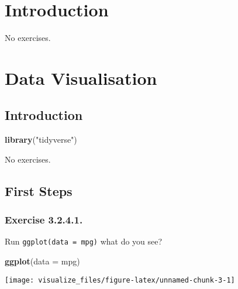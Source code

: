 \documentclass[]{book}
\newenvironment{Shaded}{\begin{snugshade}}{\end{snugshade}}
\newcommand{\DataTypeTok}[1]{\textcolor[rgb]{0.13,0.29,0.53}{#1}}
\newcommand{\KeywordTok}[1]{\textcolor[rgb]{0.13,0.29,0.53}{\textbf{#1}}}
\newcommand{\NormalTok}[1]{#1}
\newcommand{\StringTok}[1]{\textcolor[rgb]{0.31,0.60,0.02}{#1}}
\theoremstyle{plain}
\theoremstyle{remark}
\begin{document}
\hypertarget{explore-intro}{%
\chapter{Introduction}\label{explore-intro}}

No exercises.

\hypertarget{data-visualisation}{%
\chapter{Data Visualisation}\label{data-visualisation}}

\hypertarget{introduction-1}{%
\section{Introduction}\label{introduction-1}}

\begin{Shaded}
\begin{Highlighting}[]
\KeywordTok{library}\NormalTok{(}\StringTok{"tidyverse"}\NormalTok{)}
\end{Highlighting}
\end{Shaded}

No exercises.

\hypertarget{first-steps}{%
\section{First Steps}\label{first-steps}}

\hypertarget{exercise-3.2.4.1.}{%
\subsection*{\texorpdfstring{Exercise
{3.2.4.1}.}{Exercise 3.2.4.1.}}\label{exercise-3.2.4.1.}}

Run \texttt{ggplot(data\ =\ mpg)} what do you see?

\begin{Shaded}
\begin{Highlighting}[]
\KeywordTok{ggplot}\NormalTok{(}\DataTypeTok{data =}\NormalTok{ mpg)}
\end{Highlighting}
\end{Shaded}

\begin{center}\texttt{[image: visualize\_files/figure-latex/unnamed-chunk-3-1]} \end{center}
\end{document}
